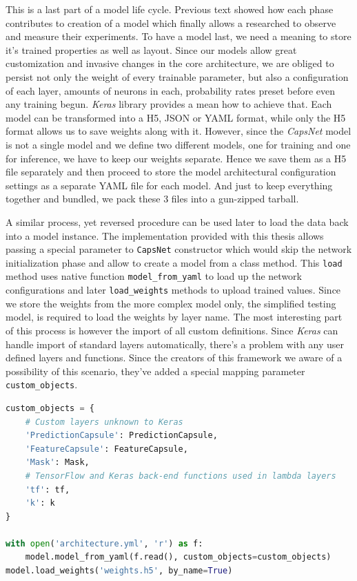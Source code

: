 This is a last part of a model life cycle. Previous text showed how each phase contributes to creation of a model which finally allows a researched to observe and measure their experiments. To have a model last, we need a meaning to store it's trained properties as well as layout. Since our models allow great customization and invasive changes in the core architecture, we are obliged to persist not only the weight of every trainable parameter, but also a configuration of each layer, amounts of neurons in each, probability rates preset before even any training begun. \textit{Keras} library provides a mean how to achieve that. Each model can be transformed into a H5, JSON or YAML format, while only the H5 format allows us to save weights along with it. However, since the \textit{CapsNet} model is not a single model and we define two different models, one for training and one for inference, we have to keep our weights separate. Hence we save them as a H5 file separately and then proceed to store the model architectural configuration settings as a separate YAML file for each model. And just to keep everything together and bundled, we pack these 3 files into a gun-zipped tarball.

A similar process, yet reversed procedure can be used later to load the data back into a model instance. The implementation provided with this thesis allows passing a special parameter to \texttt{CapsNet} constructor which would skip the network initialization phase and allow to create a model from a class method. This \texttt{load} method uses native function \texttt{model\_from\_yaml} to load up the network configurations and later \texttt{load\_weights} methods to upload trained values. Since we store the weights from the more complex model only, the simplified testing model, is required to load the weights by layer name. The most interesting part of this process is however the import of all custom definitions. Since \textit{Keras} can handle import of standard layers automatically, there's a problem with any user defined layers and functions. Since the creators of this framework we aware of a possibility of this scenario, they've added a special mapping parameter \texttt{custom\_objects}.

\begin{lstlisting}[language=Python, caption=Loading a model in \textit{Keras}.]
custom_objects = {
    # Custom layers unknown to Keras
    'PredictionCapsule': PredictionCapsule,
    'FeatureCapsule': FeatureCapsule,
    'Mask': Mask,
    # TensorFlow and Keras back-end functions used in lambda layers
    'tf': tf,
    'k': k
}

with open('architecture.yml', 'r') as f:
    model.model_from_yaml(f.read(), custom_objects=custom_objects)
model.load_weights('weights.h5', by_name=True)
\end{lstlisting}

